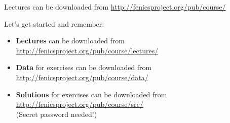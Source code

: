 \documentclass{fenicscourse}
\begin{document}
\begin{frame}
  \normalsize

  {\footnotesize Lectures can be downloaded from
    \url{http://fenicsproject.org/pub/course/}}
\end{frame}







%




\begin{frame}{Let's get started and remember:}

\linespread{2.0}
\bigskip
\begin{itemize}
\item
{\footnotesize \textbf{Lectures} can be downloaded from
  \url{http://fenicsproject.org/pub/course/lectures/}}

\item
{\footnotesize \textbf{Data} for exercises can be downloaded from
  \url{http://fenicsproject.org/pub/course/data/}}

\item
{\footnotesize \textbf{Solutions} for exercises can be downloaded from
  \url{http://fenicsproject.org/pub/course/src/} \\
(Secret password needed!)
}
\end{itemize}
\linespread{1.0}

\end{frame}
\end{document}
